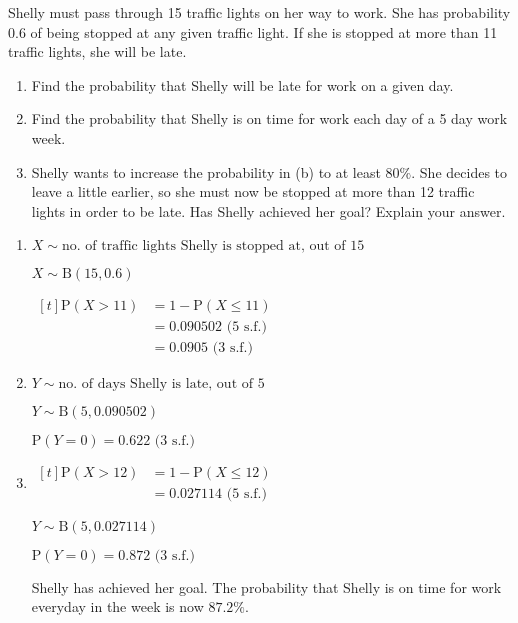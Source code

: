 \documentclass[11pt,a4paper]{book}
\begin{document}
\begin{example}

Shelly must pass through 15 traffic lights on her way to work. She
has probability $0.6$ of being stopped at any given traffic light.
If she is stopped at more than 11 traffic lights, she will be late.

\begin{enumerate}[label=(\alph*)]

\item  Find the probability that Shelly will be late for work on
a given day.

\item  Find the probability that Shelly is on time for work each
day of a 5 day work week.

\item  Shelly wants to increase the probability in (b) to at least
$80\%$. She decides to leave a little earlier, so she must now be
stopped at more than 12 traffic lights in order to be late. Has Shelly
achieved her goal? Explain your answer.

\end{enumerate}

\Solution

\begin{enumerate}[label=(\alph*)]

\item  $X\sim\text{no. of traffic lights Shelly is stopped at, out of 15}$

$X\sim\text{B}\left(15,0.6\right)$

$
\begin{aligned}[t]
\text{P}\left(X>11\right) & =1-\text{P}\left(X\leq11\right)\\
 & =0.090502\text{ (5 s.f.)}\\
 & =0.0905\text{ (3 s.f.)}
\end{aligned}
$

\item  $Y\sim\text{no. of days Shelly is late, out of 5}$

$Y\sim\text{B}\left(5,0.090502\right)$

$\text{P}\left(Y=0\right)=0.622\text{ (3 s.f.)}$

\item
$
\begin{aligned}[t]
\text{P}\left(X>12\right) & =1-\text{P}\left(X\leq12\right)\\
 & =0.027114\text{ (5 s.f.)}
\end{aligned}
$

$Y\sim\text{B}\left(5,0.027114\right)$

$\text{P}\left(Y=0\right)=0.872\text{ (3 s.f.)}$


Shelly has achieved her goal. The probability that Shelly is on time
for work everyday in the week is now $87.2\%$.


\end{enumerate}

\end{example}
\end{document}
